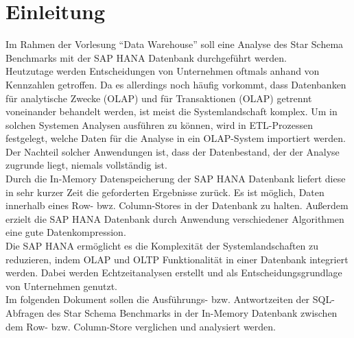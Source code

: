 \chapter{Einleitung}
Im Rahmen der Vorlesung \enquote{Data Warehouse} soll eine Analyse des Star Schema Benchmarks mit der SAP HANA Datenbank durchgeführt werden. 
\\Heutzutage werden Entscheidungen von Unternehmen oftmals anhand von Kennzahlen getroffen. Da es allerdings noch häufig vorkommt, dass Datenbanken für analytische Zwecke (OLAP) und für Transaktionen (OLAP) getrennt voneinander behandelt werden, ist meist die Systemlandschaft komplex. Um in solchen Systemen Analysen ausführen zu können,  wird in ETL-Prozessen festgelegt, welche Daten für die Analyse in ein OLAP-System importiert werden. Der Nachteil solcher Anwendungen ist, dass der Datenbestand, der der Analyse zugrunde liegt, niemals vollständig ist. 
\\Durch die In-Memory Datenspeicherung der SAP HANA Datenbank liefert diese in sehr kurzer Zeit die geforderten Ergebnisse zurück. Es ist möglich, Daten innerhalb eines Row- bwz. Column-Stores in der Datenbank zu halten. Außerdem erzielt die SAP HANA Datenbank durch Anwendung verschiedener Algorithmen eine gute Datenkompression. 
\\Die SAP HANA ermöglicht es die Komplexität der Systemlandschaften zu reduzieren, indem OLAP und OLTP Funktionalität in einer Datenbank integriert werden. Dabei werden Echtzeitanalysen erstellt und als Entscheidungsgrundlage von Unternehmen genutzt.
\\Im folgenden Dokument sollen die Ausführungs- bzw. Antwortzeiten der SQL-Abfragen des Star Schema Benchmarks in der In-Memory Datenbank zwischen dem Row- bzw. Column-Store verglichen und analysiert werden.
